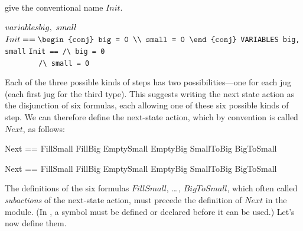\documentclass[fleqn,leqno]{article}
\begin{document}
give the conventional name $Init$.
\smallskip
\begin{display}
\begin{twocols}%
$\VARIABLES big,\ small$ 
$Init == 
\begin{conj}
big = 0 \\ small = 0
\end{conj}
$
\midcol
\verb*|VARIABLES big, small|
\verb*|Init == /\ big = 0| \\
\verb*|        /\ small = 0|
\end{twocols}
\end{display}
\smallskip
Each of the three possible kinds of steps has two possibilities---one
for each jug (each first jug for the third type).  This suggests
writing the next state action as the disjunction of six formulas, each
allowing one of these six possible kinds of step.  We can therefore
define the next-state action, which by convention is called $Next$, as
follows:
\medskip
\begin{twocols}%
\begin{notla}
Next == \/ FillSmall 
        \/ FillBig    
        \/ EmptySmall 
        \/ EmptyBig    
        \/ SmallToBig    
        \/ BigToSmall 
\end{notla}
\begin{tlatex}
%
%
%
%
%
%
\end{tlatex}
\midcol
\begin{verbatim*}
Next == \/ FillSmall 
        \/ FillBig    
        \/ EmptySmall 
        \/ EmptyBig    
        \/ SmallToBig    
        \/ BigToSmall 
\end{verbatim*}
\end{twocols}
\medskip
The definitions of the six formulas $FillSmall$, \ldots\,, $BigToSmall$,
which often called 
\emph{subactions} of the next-state action, must
precede the definition of $Next$ in the module.  (In \tlaplus, a
symbol must be defined or declared before it can be used.)  Let's now
define them.  
\end{document}
